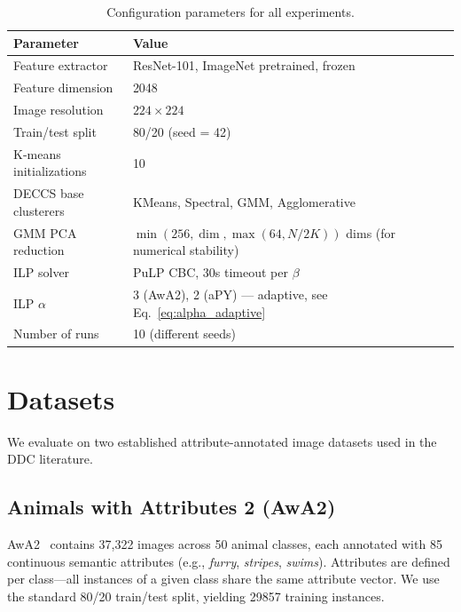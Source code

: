 \begin{table}[H]
    \centering
    \caption{Configuration parameters for all experiments.}
    \label{tab:config}
    \begin{tabular}{ll}
        \hline
        \textbf{Parameter} & \textbf{Value} \\
        \hline
        Feature extractor & ResNet-101, ImageNet pretrained, frozen \\
        Feature dimension & 2048 \\
        Image resolution & $224 \times 224$ \\
        Train/test split & 80/20 (seed = 42) \\
        K-means initializations & 10 \\
        DECCS base clusterers & KMeans, Spectral, GMM, Agglomerative \\
        GMM PCA reduction & $\min(256, \dim, \max(64, N/2K))$ dims (for numerical stability) \\
        ILP solver & PuLP CBC, 30s timeout per $\beta$ \\
        ILP $\alpha$ & 3 (AwA2), 2 (aPY) --- adaptive, see Eq.~\ref{eq:alpha_adaptive} \\
        Number of runs & 10 (different seeds) \\
        \hline
    \end{tabular}
\end{table}


\section{Datasets}
\label{sec:datasets}

We evaluate on two established attribute-annotated image datasets used in the DDC literature.

\subsection{Animals with Attributes 2 (AwA2)}

AwA2~\citep{Xian2018} contains 37,322 images across 50 animal classes, each annotated with 85 continuous semantic attributes (e.g., \textit{furry}, \textit{stripes}, \textit{swims}). Attributes are defined per class---all instances of a given class share the same attribute vector. We use the standard 80/20 train/test split, yielding 29857 training instances.

